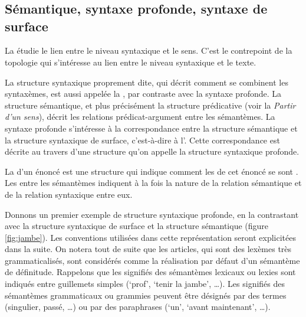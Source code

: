 \chapter{}\label{sec:13}

\section{Sémantique, syntaxe profonde, syntaxe de surface}

La  étudie le lien entre le niveau syntaxique et le sens. C’est le contrepoint de la topologie qui s’intéresse au lien entre le niveau syntaxique et le texte.

La structure syntaxique proprement dite, qui décrit comment se combinent les syntaxèmes, est aussi appelée la , par contraste avec la syntaxe profonde. La structure sémantique, et plus précisément la structure prédicative (voir la  \textit{Partir d’un sens}), décrit les relations prédicat-argument entre les sémantèmes. La syntaxe profonde s’intéresse à la correspondance entre la structure sémantique et la structure syntaxique de surface, c’est-à-dire à l’. Cette correspondance est décrite au travers d’une structure qu’on appelle la structure syntaxique profonde.

{La  d’un énoncé est une structure qui indique comment les  de cet énoncé se sont . Les  entre les sémantèmes indiquent à la fois la nature de la relation sémantique et de la relation syntaxique entre eux.}

Donnons un premier exemple de structure syntaxique profonde, en la contrastant avec la structure syntaxique de surface et la structure sémantique (figure \ref{fig:jambe}). Les conventions utilisées dans cette représentation seront explicitées dans la suite. On notera tout de suite que les articles, qui sont des lexèmes très grammaticalisés, sont considérés comme la réalisation par défaut d’un sémantème de définitude. Rappelons que les signifiés des sémantèmes lexicaux ou lexies sont indiqués entre guillemets simples (‘prof’, ‘tenir la jambe’, …). Les signifiés des sémantèmes grammaticaux ou grammies peuvent être désignés par des termes (singulier, passé, …) ou par des paraphrases (‘un’, ‘avant maintenant’, …). 

